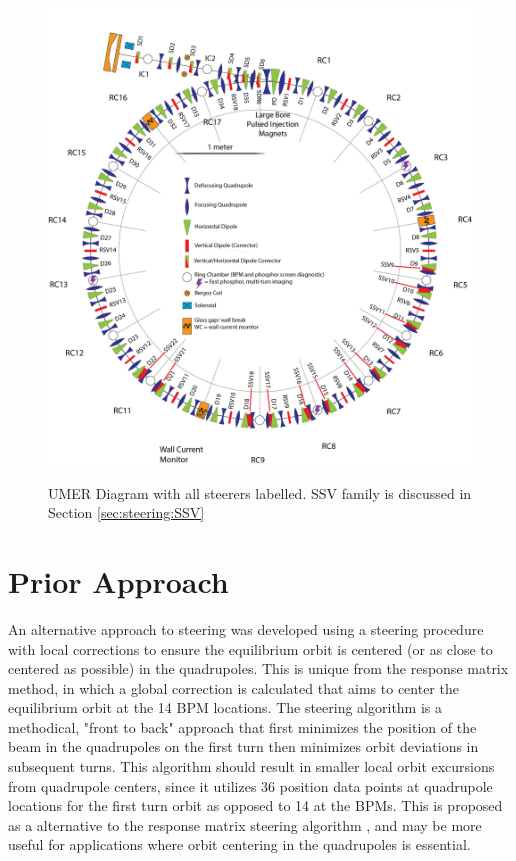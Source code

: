 \begin{figure}
\begin{center}
\includegraphics[width=\textwidth]{4.figures/full_ring_steerers_labelled.png}
\end{center}
\renewcommand{\baselinestretch}{1}
\small\normalsize
\begin{quote}
\caption[]{UMER Diagram with all steerers labelled. SSV family is discussed in Section \ref{sec:steering:SSV}}
\label{fig:steerers-labelled}
\end{quote}
\end{figure} 
\renewcommand{\baselinestretch}{2}
\small\normalsize



\section{Prior Approach}




An alternative approach to steering was developed using a steering procedure with local corrections to ensure the equilibrium orbit is centered (or as close to centered as possible) in the quadrupoles. This is unique from the response matrix method, in which a global correction is calculated that aims to center the equilibrium orbit at the 14 BPM locations. The steering algorithm is a methodical, "front to back" approach that first minimizes the position of the beam in the quadrupoles on the first turn then minimizes orbit deviations in subsequent turns. This algorithm should result in smaller local orbit excursions from quadrupole centers, since it utilizes 36 position data points at quadrupole locations for the first turn orbit as opposed to 14 at the BPMs.
This is proposed as a alternative to the response matrix steering algorithm \cite{KPRnote:2011}, and may be more useful for applications where orbit centering in the quadrupoles is essential.

